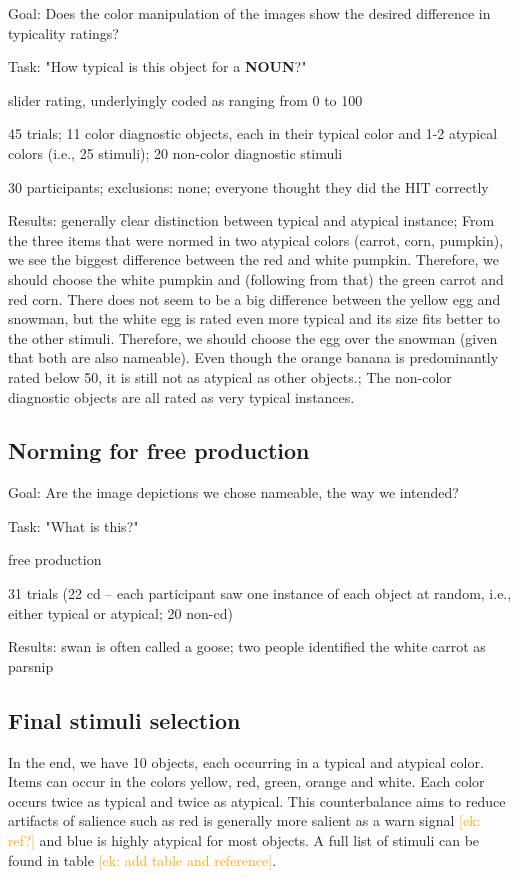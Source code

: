 \documentclass[a4paper,man,floatsintext,natbib,donotrepeattitle]{apa6}
\newcommand{\ek}[1]{\textcolor{Orange}{[ek: #1]}}
\begin{document}
Goal: Does the color manipulation of the images show the desired difference in typicality ratings?

Task: "How typical is this object for a \textbf{NOUN}?"

slider rating, underlyingly coded as ranging from 0 to 100

45 trials;
11 color diagnostic objects, each in their typical color and 1-2 atypical colors (i.e., 25 stimuli); 20 non-color diagnostic stimuli

30 participants;
exclusions: none; everyone thought they did the HIT correctly

Results: generally clear distinction between typical and atypical instance;
From the three items that were normed in two atypical colors (carrot, corn, pumpkin), we see the biggest difference between the red and white pumpkin. Therefore, we should choose the white pumpkin and (following from that) the green carrot and red corn.
There does not seem to be a big difference between the yellow egg and snowman, but the white egg is rated even more typical and its size fits better to the other stimuli. Therefore, we should choose the egg over the snowman (given that both are also nameable).
Even though the orange banana is predominantly rated below 50, it is still not as atypical as other objects.;
The non-color diagnostic objects are all rated as very typical instances.

\subsection{Norming for free production}

Goal: Are the image depictions we chose nameable, the way we intended?

Task: "What is this?"

free production

31 trials (22 cd -- each participant saw one instance of each object at random, i.e., either typical or atypical; 20 non-cd)

Results: swan is often called a goose; two people identified the white carrot as parsnip

\subsection{Final stimuli selection}

In the end, we have 10 objects, each occurring in a typical and atypical color.
Items can occur in the colors yellow, red, green, orange and white. Each color occurs twice as typical and twice as atypical. This counterbalance aims to reduce artifacts of salience such as red is generally more salient as a warn signal \ek{ref?} and blue is highly atypical for most objects. A full list of stimuli can be found in table \ek{add table and reference}.
\end{document}
